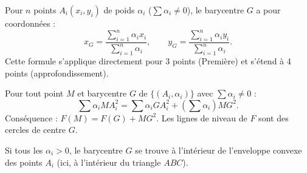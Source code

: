 \documentclass[11pt]{article}
\begin{document}
\begin{propriete}
Pour $n$ points $A_i(x_i,y_i)$ de poids $\alpha_i$ ($\sum\alpha_i \neq 0$), le barycentre $G$ a pour coordonnées :
\[
x_G = \frac{\sum_{i=1}^n \alpha_i x_i}{\sum_{i=1}^n \alpha_i},\qquad
y_G = \frac{\sum_{i=1}^n \alpha_i y_i}{\sum_{i=1}^n \alpha_i}.
\]
Cette formule s'applique directement pour 3 points (Première) et s'étend à 4 points (approfondissement).
\end{propriete}

\begin{propriete}
Pour tout point $M$ et barycentre $G$ de $\{(A_i,\alpha_i)\}$ avec $\sum\alpha_i \neq 0$ :
\[
\sum \alpha_i MA_i^2 = \sum \alpha_i GA_i^2 + \left(\sum\alpha_i\right) MG^2.
\]
Conséquence : $F(M) = F(G) + MG^2$. Les lignes de niveau de $F$ sont des cercles de centre $G$.
\end{propriete}

\begin{propriete}
Si tous les $\alpha_i > 0$, le barycentre $G$ se trouve à l'intérieur de l'enveloppe convexe des points $A_i$ (ici, à l'intérieur du triangle $ABC$).
\end{propriete}
\end{document}
